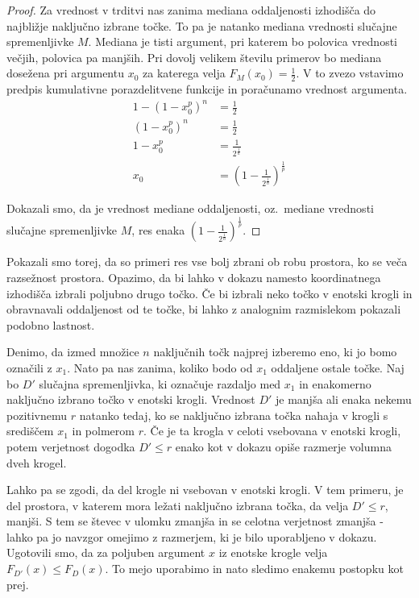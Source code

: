 \documentclass[12pt,a4paper,twoside]{article}
\theoremstyle{definition} %
\theoremstyle{plain} %
\numberwithin{equation}{section}  %
\begin{document}
\begin{proof}
Za vrednost v trditvi nas zanima mediana oddaljenosti izhodišča do najbližje naključno izbrane točke. 
To pa je natanko mediana vrednosti slučajne spremenljivke $M$. 
Mediana je tisti argument, pri katerem bo polovica vrednosti večjih, polovica pa manjših. 
Pri dovolj velikem številu primerov bo mediana dosežena pri argumentu $x_0$ za katerega velja $F_M(x_0) = \frac{1}{2}$. 
V to zvezo vstavimo predpis kumulativne porazdelitvene funkcije in poračunamo vrednost argumenta.
\begin{align*}
1 - (1 - x_0^p)^n & = \frac{1}{2} \\
(1 - x_0^p)^n & = \frac{1}{2} \\
1 - x_0^p & = \frac{1}{2^{\frac{1}{n}}} \\
x_0 & = (1 - \frac{1}{2^{\frac{1}{n}}})^{\frac{1}{p}}
\end{align*}

Dokazali smo, da je vrednost mediane oddaljenosti, oz.~mediane vrednosti slučajne spremenljivke $M$, res enaka $(1 - \frac{1}{2^{\frac{1}{n}}})^{\frac{1}{p}}$.

\end{proof}

Pokazali smo torej, da so primeri res vse bolj zbrani ob robu prostora, ko se veča razsežnost prostora. 
Opazimo, da bi lahko v dokazu namesto koordinatnega izhodišča izbrali poljubno drugo točko. 
Če bi izbrali neko točko v enotski krogli in obravnavali oddaljenost od te točke, bi lahko z analognim razmislekom pokazali podobno lastnost.

Denimo, da izmed množice $n$ naključnih točk najprej izberemo eno, ki jo bomo označili z $x_1$. 
Nato pa nas zanima, koliko bodo od $x_1$ oddaljene ostale točke. 
Naj bo $D'$ slučajna spremenljivka, ki označuje razdaljo med $x_1$ in enakomerno naključno izbrano točko v enotski krogli. 
Vrednost $D'$ je manjša ali enaka nekemu pozitivnemu $r$ natanko tedaj, ko se naključno izbrana točka nahaja v krogli s središčem $x_1$ in polmerom $r$. 
Če je ta krogla v  celoti vsebovana v enotski krogli, potem verjetnost dogodka $D' \leq r$ enako kot v dokazu opiše razmerje volumna dveh krogel. 

Lahko pa se zgodi, da del krogle ni vsebovan v enotski krogli. 
V tem primeru, je del prostora, v katerem mora ležati naključno izbrana točka, da velja $D' \leq r$, manjši. 
S tem se števec v ulomku zmanjša in se celotna verjetnost zmanjša - lahko pa jo navzgor omejimo z razmerjem, ki je bilo uporabljeno v dokazu. 
Ugotovili smo, da za poljuben argument $x$ iz enotske krogle velja $F_{D'}(x) \leq F_D(x)$. To mejo uporabimo in nato sledimo enakemu postopku kot prej.
\end{document}
